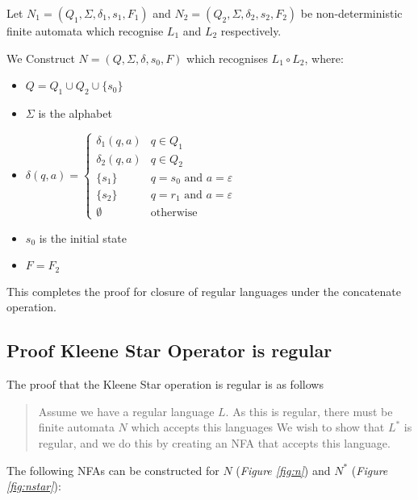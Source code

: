 \documentclass[11pt]{article}
\begin{document}
Let $N_1=(Q_1,\Sigma,\delta_1,s_1,F_1)$ and $N_2=(Q_2,\Sigma,\delta_2,s_2,F_2)$
be non-deterministic finite automata which recognise $L_1$ and $L_2$
respectively.

We Construct $N=(Q,\Sigma,\delta,s_0,F)$ which recognises $L_1 \circ L_2$, where:

\begin{itemize}
	\item[] $Q = Q_1 \cup Q_2 \cup \{s_0\}$
	\item[] $\Sigma$ is the alphabet
	\item[] $\delta(q,a) =
		      \begin{cases}
			      \delta_1 (q,a) & q\in Q_1                         \\
			      \delta_2 (q,a) & q \in Q_2                        \\
			      \{s_1\}        & q=s_0 \text{ and } a=\varepsilon \\
			      \{s_2\}        & q=r_1 \text{ and } a=\varepsilon \\
			      \emptyset      & \text{otherwise}
		      \end{cases}$
	\item[] $s_0$ is the initial state
	\item[] $F = F_2$
\end{itemize}

This completes the proof for closure of regular languages under the
concatenate operation.

\newpage
\subsection{Proof Kleene Star Operator is regular}
The proof that the Kleene Star operation is regular is as follows
\begin{quote}
	Assume we have a regular language $L$. As this is regular, there
	must be finite automata $N$ which accepts this languages
	We wish to show that $L^\ast$ is regular, and we do this
	by creating an NFA that accepts this language.
\end{quote}

The following NFAs can be constructed for $N$ (\emph{Figure \ref{fig:n}})
and $N^\ast$ (\emph{Figure \ref{fig:nstar}}):
\end{document}
